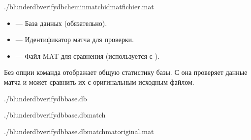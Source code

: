 \documentclass[letterpaper,10pt,russian]{sphinxmanual}
\begin{document}
\begin{sphinxVerbatim}[commandchars=\\\{\}]
./blunderdbverify\PYGZhy{}\PYGZhy{}db\PYGZlt{}chemin\PYGZgt{}\PYG{o}{[}\PYGZhy{}\PYGZhy{}match\PYGZlt{}id\PYGZgt{}\PYG{o}{]}\PYG{o}{[}\PYGZhy{}\PYGZhy{}mat\PYGZlt{}fichier.mat\PYGZgt{}\PYG{o}{]}
\end{sphinxVerbatim}

\sphinxAtStartPar
{}
\begin{itemize}
\item {} 
\sphinxAtStartPar
{} — База данных (обязательно).

\item {} 
\sphinxAtStartPar
{} — Идентификатор матча для проверки.

\item {} 
\sphinxAtStartPar
{} — Файл MAT для сравнения (используется с ).

\end{itemize}

\sphinxAtStartPar
Без опции  команда отображает общую статистику базы. С  она проверяет данные матча и может сравнить их с оригинальным исходным файлом.

\sphinxAtStartPar
{}

\begin{sphinxVerbatim}[commandchars=\\\{\}]
./blunderdbverify\PYGZhy{}\PYGZhy{}dbbase.db

./blunderdbverify\PYGZhy{}\PYGZhy{}dbbase.db\PYGZhy{}\PYGZhy{}match

./blunderdbverify\PYGZhy{}\PYGZhy{}dbbase.db\PYGZhy{}\PYGZhy{}match\PYGZhy{}\PYGZhy{}matoriginal.mat
\end{sphinxVerbatim}
\end{document}

